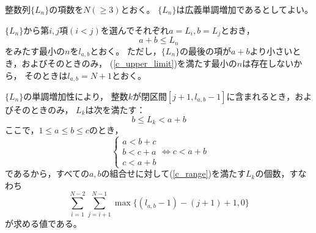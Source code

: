 \documentclass{article}
\begin{document}
整数列$\{L_n\}$の項数を$N (\geq 3)$とおく。
$\{L_n\}$は広義単調増加であるとしてよい。

$\{L_n\}$から第$i, j$項$(i < j)$を選んでそれぞれ$a = L_i, b = L_j$とおき，
\begin{equation}
    \label{c_upper_limit}
    a + b \leq L_n
\end{equation}
をみたす最小の$n$を$l_{a, b}$とおく。
ただし，$\{L_n\}$の最後の項が$a + b$より小さいとき，およびそのときのみ，
(\ref{c_upper_limit})を満たす最小の$n$は存在しないから，
そのときは$l_{a, b} = N + 1$とおく。

$\{L_n\}$の単調増加性により，
整数$k$が閉区間$[j + 1, l_{a, b} - 1]$に含まれるとき，およびそのときのみ，
$L_k$は次を満たす：
\begin{equation}
    \label{c_range}
    b \leq L_k < a + b
\end{equation}
ここで，$1 \leq a \leq b \leq c$のとき，
\begin{equation*}
    \begin{cases}
        a < b + c \\
        b < c + a \\
        c < a + b
    \end{cases}
    \Longleftrightarrow
    c < a + b
\end{equation*}
であるから，すべての$a, b$の組合せに対して(\ref{c_range})を満たす$L_k$の個数，すなわち
\begin{equation*}
    \sum_{i = 1}^{N - 2} \sum_{j = i + 1}^{N - 1}
    \max \{ (l_{a, b} - 1) - (j + 1) + 1, 0 \}
\end{equation*}
が求める値である。
\end{document}
